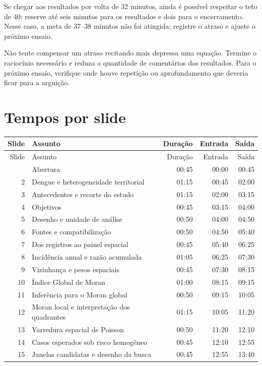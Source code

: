 \documentclass[11pt,a4paper]{article}
\begin{document}
Se chegar aos resultados por volta de 32 minutos, ainda é possível respeitar o teto de 40: reserve até seis minutos para os resultados e dois para o encerramento. Nesse caso, a meta de 37--38 minutos não foi atingida; registre o atraso e ajuste o próximo ensaio.

Não tente compensar um atraso recitando mais depressa uma equação. Termine o raciocínio necessário e reduza a quantidade de comentários dos resultados. Para o próximo ensaio, verifique onde houve repetição ou aprofundamento que deveria ficar para a arguição.\clearpage
\section*{Tempos por slide}
{\small\setlength{\tabcolsep}{4pt}
\begin{longtable}{@{}r p{8.1cm} r r r@{}}
\toprule Slide & Assunto & Duração & Entrada & Saída\\\midrule\endfirsthead
\toprule Slide & Assunto & Duração & Entrada & Saída\\\midrule\endhead
\bottomrule\endfoot
1 & Abertura & 00:45 & 00:00 & 00:45\\
2 & Dengue e heterogeneidade territorial & 01:15 & 00:45 & 02:00\\
3 & Antecedentes e recorte do estudo & 01:15 & 02:00 & 03:15\\
4 & Objetivos & 00:45 & 03:15 & 04:00\\
5 & Desenho e unidade de análise & 00:50 & 04:00 & 04:50\\
6 & Fontes e compatibilização & 00:50 & 04:50 & 05:40\\
7 & Dos registros ao painel espacial & 00:45 & 05:40 & 06:25\\
8 & Incidência anual e razão acumulada & 01:05 & 06:25 & 07:30\\
9 & Vizinhança e pesos espaciais & 00:45 & 07:30 & 08:15\\
10 & Índice Global de Moran & 01:00 & 08:15 & 09:15\\
11 & Inferência para o Moran global & 00:50 & 09:15 & 10:05\\
12 & Moran local e interpretação dos quadrantes & 01:15 & 10:05 & 11:20\\
13 & Varredura espacial de Poisson & 00:50 & 11:20 & 12:10\\
14 & Casos esperados sob risco homogêneo & 00:45 & 12:10 & 12:55\\
15 & Janelas candidatas e desenho da busca & 00:45 & 12:55 & 13:40\\

\end{longtable}}
\end{document}
